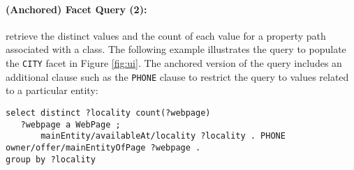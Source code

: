 \paragraph{(Anchored) Facet Query (2):} retrieve the distinct values and the count of each value for a property path associated with a class.
The following example illustrates the query to populate the \verb|CITY| facet in Figure \ref{fig:ui}.
The anchored version of the query includes an additional clause such as the \verb|PHONE| clause to restrict the query to values related to a particular entity:
{\footnotesize
\begin{verbatim}
select distinct ?locality count(?webpage)
   ?webpage a WebPage ;
       mainEntity/availableAt/locality ?locality . PHONE owner/offer/mainEntityOfPage ?webpage .
group by ?locality
\end{verbatim}}
